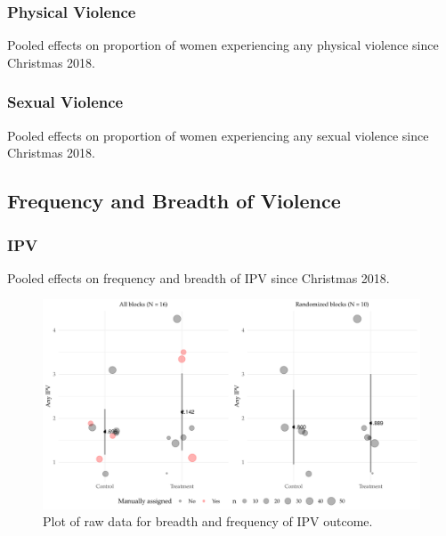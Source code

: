 \documentclass[11pt,english]{article}
\begin{document}
\subsubsection{Physical Violence}

\begin{table}[H]
\centering

\caption{Pooled effects on proportion of women experiencing any physical violence since Christmas 2018.}
\label{tab:physical}
\end{table}

\subsubsection{Sexual Violence}

\begin{table}[H]
\centering

\caption{Pooled effects on proportion of women experiencing any sexual violence since Christmas 2018.}
\label{tab:sexual}
\end{table}

\subsection{Frequency and Breadth of Violence}

\subsubsection{IPV}

\begin{table}[H]
\centering

\caption{Pooled effects on frequency and breadth of IPV since Christmas 2018.}
\label{tab:ipv}
\end{table}

\begin{figure}[H]
\centering
\includegraphics[width = \textwidth]{figures/pooled_ipv_freq_plot.pdf}
\caption{Plot of raw data for breadth and frequency of IPV outcome.}
\label{fig:pooled_ipv_freq_plot}
\end{figure}
\end{document}
